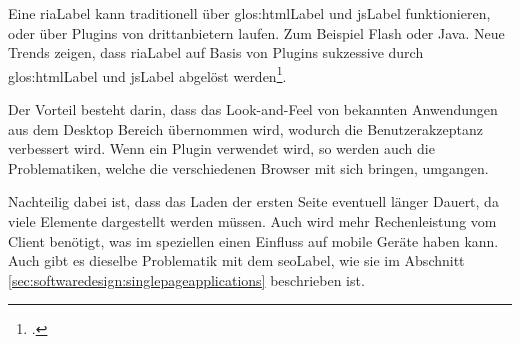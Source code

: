 Eine \gls{riaLabel} kann traditionell über \Gls{glos:htmlLabel} und \gls{jsLabel} funktionieren, oder über Plugins von drittanbietern laufen. Zum Beispiel Flash oder Java. Neue Trends zeigen, dass \gls{riaLabel} auf Basis von Plugins sukzessive durch \Gls{glos:htmlLabel} und \gls{jsLabel} abgelöst werden\footcite{Rich_Internet_Application_Market_Share_Global_Usage_2015-06-07}.

Der Vorteil besteht darin, dass das Look-and-Feel von bekannten Anwendungen aus dem Desktop Bereich übernommen wird, wodurch die Benutzerakzeptanz verbessert wird. Wenn ein Plugin verwendet wird, so werden auch die Problematiken, welche die verschiedenen Browser mit sich bringen, umgangen. 

Nachteilig dabei ist, dass das Laden der ersten Seite eventuell länger Dauert, da viele Elemente dargestellt werden müssen. Auch wird mehr Rechenleistung vom Client benötigt, was im speziellen einen Einfluss auf mobile Geräte haben kann. Auch gibt es dieselbe Problematik mit dem \gls{seoLabel}, wie sie im Abschnitt \ref{sec:softwaredesign:singlepageapplications}  beschrieben ist.